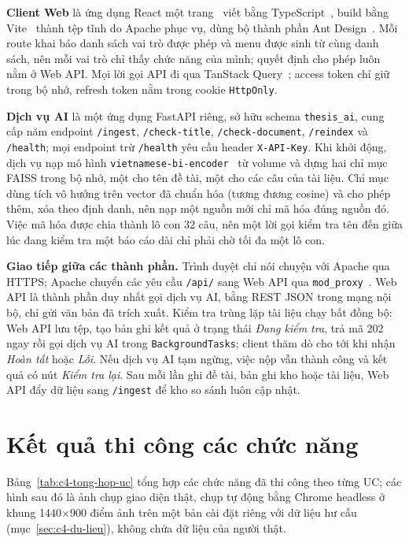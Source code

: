 \documentclass[../main.tex]{subfiles}
\begin{document}
\textbf{Client Web} là ứng dụng React một trang~\cite{react} viết bằng TypeScript~\cite{typescript}, build bằng Vite~\cite{vite} thành tệp tĩnh do Apache phục vụ, dùng bộ thành phần Ant Design~\cite{antd}. Mỗi route khai báo danh sách vai trò được phép và menu được sinh từ cùng danh sách, nên mỗi vai trò chỉ thấy chức năng của mình; quyết định cho phép luôn nằm ở Web API. Mọi lời gọi API đi qua TanStack Query~\cite{tanstackquery}; access token chỉ giữ trong bộ nhớ, refresh token nằm trong cookie \texttt{HttpOnly}.

\textbf{Dịch vụ AI} là một ứng dụng FastAPI riêng, sở hữu schema \texttt{thesis\_ai}, cung cấp năm endpoint \texttt{/ingest}, \texttt{/check-title}, \texttt{/check-document}, \texttt{/reindex} và \texttt{/health}; mọi endpoint trừ \texttt{/health} yêu cầu header \texttt{X-API-Key}. Khi khởi động, dịch vụ nạp mô hình \texttt{vietnamese-bi-encoder}~\cite{bkaibiencoder} từ volume và dựng hai chỉ mục FAISS trong bộ nhớ, một cho tên đề tài, một cho các câu của tài liệu. Chỉ mục dùng tích vô hướng trên vector đã chuẩn hóa (tương đương cosine) và cho phép thêm, xóa theo định danh, nên nạp một nguồn mới chỉ mã hóa đúng nguồn đó. Việc mã hóa được chia thành lô con 32 câu, nên một lời gọi kiểm tra tên đến giữa lúc đang kiểm tra một báo cáo dài chỉ phải chờ tối đa một lô con.

\textbf{Giao tiếp giữa các thành phần.} Trình duyệt chỉ nói chuyện với Apache qua HTTPS; Apache chuyển các yêu cầu \texttt{/api/} sang Web API qua \texttt{mod\_proxy}~\cite{apachemodproxy}. Web API là thành phần duy nhất gọi dịch vụ AI, bằng REST JSON trong mạng nội bộ, chỉ gửi văn bản đã trích xuất. Kiểm tra trùng lặp tài liệu chạy bất đồng bộ: Web API lưu tệp, tạo bản ghi kết quả ở trạng thái \textit{Đang kiểm tra}, trả mã 202 ngay rồi gọi dịch vụ AI trong \texttt{BackgroundTasks}; client thăm dò cho tới khi nhận \textit{Hoàn tất} hoặc \textit{Lỗi}. Nếu dịch vụ AI tạm ngừng, việc nộp vẫn thành công và kết quả có nút \textit{Kiểm tra lại}. Sau mỗi lần ghi đề tài, bản ghi kho hoặc tài liệu, Web API đẩy dữ liệu sang \texttt{/ingest} để kho so sánh luôn cập nhật.

\section{Kết quả thi công các chức năng}

Bảng~\ref{tab:c4-tong-hop-uc} tổng hợp các chức năng đã thi công theo từng UC; các hình sau đó là ảnh chụp giao diện thật, chụp tự động bằng Chrome headless ở khung 1440$\times$900 điểm ảnh trên một bản cài đặt riêng với dữ liệu hư cấu (mục~\ref{sec:c4-du-lieu}), không chứa dữ liệu của người thật.
\end{document}
